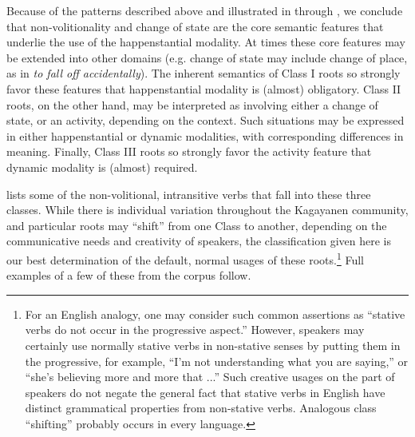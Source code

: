 Because of the patterns described above and illustrated in  through , we conclude that non-volitionality and change of state are the core semantic features that underlie the use of the happenstantial modality. At times these core features may be extended into other domains (e.g. change of state may include change of place, as in \textit{to fall off accidentally}). The inherent semantics of Class I roots so strongly favor these features that happenstantial modality is (almost) obligatory. Class II roots, on the other hand, may be interpreted as involving either a change of state, or an activity, depending on the context. Such situations may be expressed in either happenstantial or dynamic modalities, with corresponding differences in meaning. Finally, Class III roots so strongly favor the activity feature that dynamic modality is (almost) required.

\largerpage
{} lists some of the non-volitional, intransitive verbs that fall into these three classes. While there is individual variation throughout the Kagayanen community, and particular roots may “shift” from one Class to another, depending on the communicative needs and creativity of speakers, the classification given here is our best determination of the default, normal usages of these roots.\footnote{For an English analogy, one may consider such common assertions as “stative verbs do not occur in the progressive aspect.” However, speakers may certainly use normally stative verbs in non-stative senses by putting them in the progressive, for example, “I’m not understanding what you are saying,” or ``she’s believing more and more that ...” Such creative usages on the part of speakers do not negate the general fact that stative verbs in English have distinct grammatical properties from non-stative verbs. Analogous class “shifting” probably occurs in every language.} Full examples of a few of these from the corpus follow.

